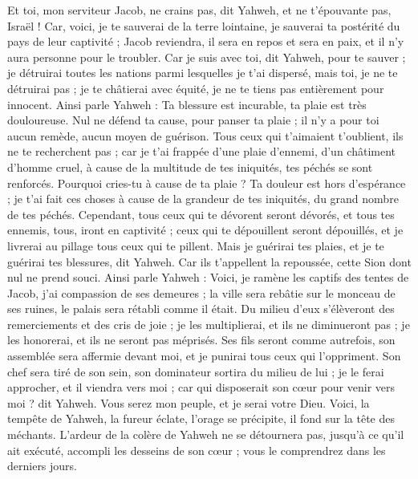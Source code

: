 \begin{multicols}{2}
Et toi, mon serviteur Jacob, ne crains pas, dit Yahweh, et ne t'épouvante pas, Israël ! Car, voici, je te sauverai de la terre lointaine, je sauverai ta postérité du pays de leur captivité ; Jacob reviendra, il sera en repos et sera en paix, et il n'y aura personne pour le troubler.
Car je suis avec toi, dit Yahweh, pour te sauver ; je détruirai toutes les nations parmi lesquelles je t'ai dispersé, mais toi, je ne te détruirai pas ; je te châtierai avec équité, je ne te tiens pas entièrement pour innocent.
Ainsi parle Yahweh : Ta blessure est incurable, ta plaie est très douloureuse.
Nul ne défend ta cause, pour panser ta plaie ; il n'y a  pour toi aucun remède, aucun moyen de guérison.
Tous ceux qui t'aimaient t'oublient, ils ne te recherchent pas ; car je t'ai frappée d'une plaie d'ennemi, d'un châtiment d’homme cruel, à cause de la multitude de tes iniquités, tes péchés se sont renforcés.
Pourquoi cries-tu à cause de ta plaie ? Ta douleur est hors d’espérance ; je t’ai fait ces choses à cause de la grandeur de tes iniquités, du grand nombre de tes péchés.
Cependant, tous ceux qui te dévorent seront dévorés, et tous tes ennemis, tous, iront en captivité ; ceux qui te dépouillent seront dépouillés, et je livrerai au pillage tous ceux qui te pillent.
Mais je guérirai tes plaies, et je te guérirai tes blessures, dit Yahweh. Car ils t’appellent la repoussée, cette Sion dont nul ne prend souci.
Ainsi parle Yahweh : Voici, je ramène les captifs des tentes de Jacob, j'ai compassion de ses demeures ; la ville sera rebâtie sur le monceau de ses ruines, le palais sera rétabli comme il était.
Du milieu d’eux s’élèveront des remerciements et des cris de joie ;  je les multiplierai, et ils ne diminueront pas ; je les honorerai, et ils ne seront pas méprisés.
Ses fils seront comme autrefois, son assemblée sera affermie devant moi, et je punirai tous ceux qui l'oppriment.
Son chef sera tiré de son sein,  son dominateur sortira du milieu de lui ; je le ferai approcher, et il viendra vers moi ; car qui disposerait son cœur pour venir vers moi ? dit Yahweh.
Vous serez mon peuple, et je serai votre Dieu.
Voici, la tempête de Yahweh, la fureur éclate, l’orage se précipite, il fond sur la tête des méchants.
L'ardeur de la colère de Yahweh ne se détournera pas, jusqu’à ce qu'il ait exécuté, accompli les desseins de son cœur ; vous le comprendrez dans les derniers jours.

\end{multicols}
